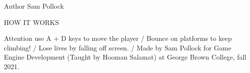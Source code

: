 \begin{DoxyAuthor}{Author}
Sam Pollock
\end{DoxyAuthor}
HOW IT WORKS \begin{DoxyAttention}{Attention}
use A + D keys to move the player / Bounce on platforms to keep climbing! / Lose lives by falling off screen. / Made by Sam Pollock for Game Engine Development (Taught by Hooman Salamat) at George Brown College, fall 2021. 
\end{DoxyAttention}
